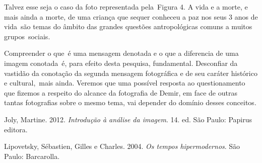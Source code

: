 \documentclass[
  letterpaper,
]{scrbook}
\newlength{\cslhangindent}
\newlength{\cslentryspacingunit} %
\newenvironment{CSLReferences}[2] %
 {%
  \setlength{\parindent}{0pt}
  \ifodd #1
  \let\oldpar\par
  \def\par{\hangindent=\cslhangindent\oldpar}
  \fi
  \setlength{\parskip}{#2\cslentryspacingunit}
 }%
 {}
\begin{document}
Talvez esse seja o caso da foto representada pela~Figura 4. A vida e a
morte, e mais ainda a morte, de uma criança que sequer conheceu a paz
nos seus 3 anos de vida~são temas do âmbito das grandes questões
antropológicas comuns a muitos grupos~sociais.

Compreender o que~é uma mensagem denotada e o que a diferencia de uma
imagem conotada~é, para efeito desta pesquisa, fundamental. Desconfiar
da vastidão da conotação da segunda mensagem fotográfica e de seu
caráter histórico e cultural,~mais ainda. Veremos que uma possível
resposta ao questionamento que fizemos a respeito do alcance da
fotografia de Demir, em face de outras tantas fotografias sobre o mesmo
tema, vai depender do domínio desses conceitos.

\hypertarget{refs}{}
\begin{CSLReferences}{1}{0}
\leavevmode{}%
Joly, Martine. 2012. \emph{Introdu{ç}{ã}o {à} an{á}lise da imagem}. 14.
ed. S{ã}o Paulo: Papirus editora.

\leavevmode{}%
Lipovetsky, Sébastien, Gilles e Charles. 2004. \emph{Os tempos
hipermodernos}. S{ã}o Paulo: Barcarolla.

\end{CSLReferences}


\backmatter
\end{document}
